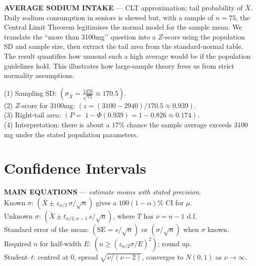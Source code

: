\documentclass[landscape,0.4pt]{article}
\begin{document}
\begin{multicols*}{6}

\textbf{\tiny{AVERAGE SODIUM INTAKE}} — CLT approximation; tail probability of $\bar{X}$.  
Daily sodium consumption in seniors is skewed but, with a sample of $n=75$, the Central Limit Theorem legitimises the normal model for the sample mean.  
We translate the “more than 3100mg’’ question into a $Z$-score using the population SD and sample size, then extract the tail area from the standard-normal table.  
The result quantifies how unusual such a high average would be if the population guidelines hold.  
This illustrates how large-sample theory frees us from strict normality assumptions.

(1) Sampling SD: $(\sigma_{\bar{X}}=\tfrac{1476}{\sqrt{75}}\approx170.5)$.\\
(2) $Z$-score for $3100$mg: $(z=(3100-2940)/170.5\approx0.939)$.\\
(3) Right-tail area: $(P=\;1-\Phi(0.939)=1-0.826\approx0.174)$.\\
(4) Interpretation: there is about a $17\%$ chance the sample average exceeds $3100$mg under the stated population parameters.\\[-2pt]


\section*{\small{Confidence Intervals}}


\textbf{\tiny{MAIN EQUATIONS}} — \textit{estimate means with stated precision}.\\
Known $\sigma$: $(\bar{X}\pm z_{\alpha/2}\,\sigma/\sqrt{n})$ gives a $100(1-\alpha)\%$ CI for $\mu$.\\
Unknown $\sigma$: $(\bar{X}\pm t_{\alpha/2,n-1}\,s/\sqrt{n})$, where $T$ has $\nu=n-1$ d.f.\\
Standard error of the mean: $(\text{SE}=s/\sqrt{n})$ or $(\sigma/\sqrt{n})$ when $\sigma$ known.\\
Required $n$ for half-width $E$: $(n\ge(z_{\alpha/2}\sigma/E)^{2})$; round up.\\
Student–$t$: centred at $0$, spread $\sqrt{\nu/(\nu-2)}$, converges to $N(0,1)$ as $\nu\to\infty$.\\[-2pt]


\end{multicols*}
\end{document}
